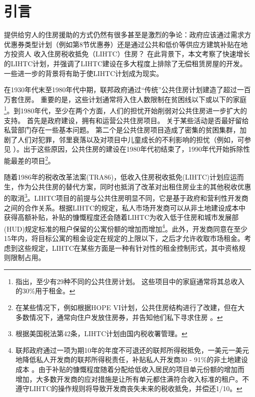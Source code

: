 \documentclass[lang=cn,11pt,a4paper]{elegantpaper}
\begin{document}
\section{引言}

提供给穷人的住房援助的方式仍然有很多甚至是激烈的争论：政府应该通过需求方优惠券类型计划（例如第8节优惠券）还是通过公共和低价等供应方建筑补贴在地方投资人 收入住房税收抵免（LIHTC）住房？ 在此背景下，本文考察了快速增长的LIHTC计划，并强调了LIHTC建设在多大程度上排除了无偿租赁房屋的开发。 一些进一步的背景将有助于使LIHTC计划成为现实。

在1930年代末至1980年代中期，联邦政府通过“传统”公共住房计划建造了超过一百万套住房。 重要的是，这些计划通常将入住人数限制在贫困线以下或以下的家庭 \citep{Olsen2003365}\footnote{\cite{Olsen2003365}指出，至少有29种不同的公共住房计划。 这些项目中的家庭通常将其总收入的30\%用于租金。}。到1980年代，至少在两个方面，人们的担忧开始削弱对公共住房进一步扩大的支持。 首先是政府建设，拥有和运营公共住房项目。 关于某些活动是否最好留给私营部门存在一些基本问题。 第二个是公共住房项目造成了密集的贫困集群，加剧了人们对犯罪，邻里衰落以及对项目中儿童成长的不利影响的担忧（例如，可参见 \cite{Currie200099,Jencks1990111}）。出于这些原因，公共住房的建设在1980年代初结束了，1990年代开始拆除性能最差的项目\footnote{在某些情况下，例如根据HOPE VI计划，公共住房结构进行了改建，但在大多数情况下，通常向住户发放住房券，并告知他们私下寻求住房 \cite{Jacob2004233}。}。

随着1986年的税收改革法案(TRA86)，低收入住房税收抵免(LIHTC)计划应运而生，作为公共住房的替代方案，同时也抵消了改革对出租住房业主的其他税收优惠的取消\citep{USCongress1987}\footnote{根据美国税法第42条，LIHTC计划由国内税收署管理。}。LIHTC项目的前提与公共住房明显不同，它是基于政府和营利性开发商之间的合作关系。根据LIHTC的规定，私人市场开发商可以从非土地建设成本中获得高额补贴，补贴的慷慨程度还会随着LIHTC为收入低于住房和城市发展部(HUD)规定标准的租户保留的公寓份额的增加而增加\footnote{联邦政府通过一项为期10年的年度不可退还的联邦所得税抵免，一美元一美元地降低私人开发商的联邦所得税责任，补贴私人开发商30 - 91\%的非土地建设成本 \cite{Eriksen2009141}。由于补贴的慷慨程度随着分配给低收入居民的项目单元份额的增加而增加，大多数开发商的应对措施是让所有单元都住满符合收入标准的租户。不遵守LIHTC的操作规则将导致开发商丧失未来的税收抵免，并偿还1/10。}。此外，开发商同意在至少15年内，将目标公寓的租金设定在规定的上限以下，之后才允许收取市场租金。考虑到这些规定，LIHTC在某些方面是一种有针对性的租金控制形式，其中资格规则限制占用。
\end{document}
